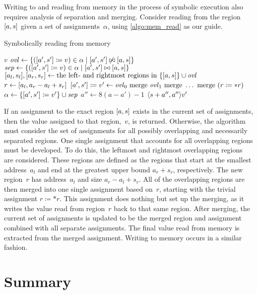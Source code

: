 Writing to and reading from memory in the process of symbolic execution
also requires analysis of separation and merging.
Consider reading from the region $[a,s]$ given a set of assignments~$\alpha$,
using \cref{algo:mem_read} as our guide.
\begin{algorithm}
  \caption{Symbolically reading from memory}\label{algo:mem_read}
  \begin{algorithmic}
        \State\Return $v$
      \Else
        \State $\mathit{ovl}\gets\{([a',s']\coloneqq v)\in
        \alpha\mid[a',s']\not\bowtie[a,s]\}$
        \State $\mathit{sep}\gets\{([a',s']\coloneqq v)\in
        \alpha\mid[a',s']\bowtie[a,s]\}$
        \State $[a_l,s_l],[a_r,s_r]\gets
        \text{the left- and rightmost regions in }\{[a,s]\}\cup\mathit{ovl}$
        \State $r\gets[a_l,a_r-a_l+s_r]$
        \State $[a',s']\coloneqq v'\gets
        \mathit{ovl}_0\text{ merge }\mathit{ovl}_1\text{ merge }\ldots\text{ merge }(r\coloneqq *r)$
        \State $\alpha\gets\{[a',s']\coloneqq v'\}\cup\mathit{sep}$
        \State $a''\gets8(a-a')-1$
        \State\Return $\langle s+a'',a''\rangle v'$
      \EndIf
    \EndFunction
  \end{algorithmic}
\end{algorithm}
If an assignment to the exact region $[a,s]$
exists in the current set of assignments,
then the value assigned to that region,~$v$, is returned.
Otherwise, the algorithm must consider the set of assignments
for all possibly overlapping and necessarily separated regions.
One single assignment that accounts for all overlapping regions must be developed.
To do this, the leftmost and rightmost overlapping regions are considered.
These regions are defined as the regions that start at the smallest address~$a_l$
and end at the greatest upper bound $a_r+s_r$, respectively.
The new region~$r$ has address~$a_l$ and size $a_r-a_l+s_r$.
All of the overlapping regions are then merged into one single assignment based on~$r$,
starting with the trivial assignment $r\coloneqq *r$.
This assignment does nothing but set up the merging,
as it writes the value read from region~$r$ back to that same region.
After merging, the current set of assignments is updated to be the merged region
and assignment combined with all separate assignments.
The final value read from memory is extracted from the merged assignment.
Writing to memory occurs in a similar fashion.

\section{Summary}

